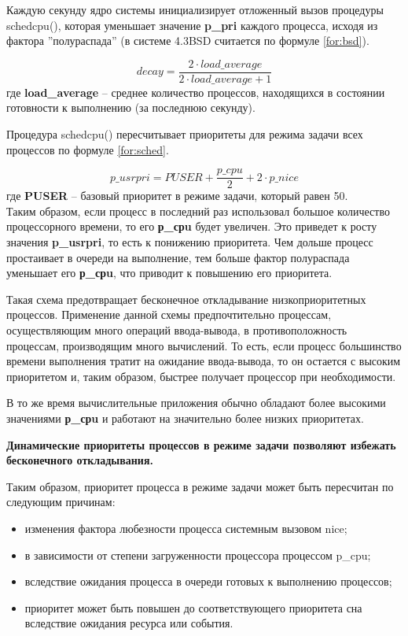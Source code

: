 \documentclass[a4paper,14pt,russian]{extreport}
\begin{document}
	Каждую секунду ядро системы инициализирует отложенный вызов процедуры schedcpu(), которая уменьшает значение \textbf{p\_pri} каждого процесса, исходя из фактора ”полураспада” (в системе 4.3BSD считается по формуле \ref{for:bsd}).
	
	\begin{equation}
		\label{for:bsd}
		decay = \frac{2 \cdot load\_average}{2 \cdot load\_average + 1}
	\end{equation}
	где \textbf{load\_average} -- среднее количество процессов, находящихся в состоянии готовности к выполнению (за последнюю секунду).
	
	Процедура schedcpu() пересчитывает приоритеты для режима задачи всех процессов по формуле \ref{for:sched}.
	
	\begin{equation}
		\label{for:sched}
		p\_usrpri = PUSER + \frac{p\_cpu}{2} + 2 \cdot p\_nice
	\end{equation}
	где \textbf{PUSER} -- базовый приоритет в режиме задачи, который равен 50.
	\\
	
	Таким образом, если процесс в последний раз использовал большое количество процессорного времени, то его \textbf{р\_срu} будет увеличен.
	Это приведет к росту значения \textbf{p\_usrpri}, то есть к понижению приоритета.
	Чем дольше процесс простаивает в очереди на выполнение, тем больше фактор полураспада уменьшает его \textbf{р\_срu}, что приводит к повышению его приоритета.
	
	Такая схема предотвращает бесконечное откладывание низкоприоритетных процессов.
	Применение данной схемы предпочтительно процессам, осуществляющим много операций ввода-вывода, в противоположность процессам, производящим много вычислений.
	То есть, если процесс большинство времени выполнения тратит на ожидание ввода-вывода, то он остается с высоким приоритетом и, таким образом, быстрее получает процессор при необходимости.
	
	В то же время вычислительные приложения обычно обладают более высокими значениями \textbf{р\_срu} и работают на значительно более низких приоритетах.
	
	\textbf{Динамические приоритеты процессов в режиме задачи позволяют избежать бесконечного откладывания.}
	
	Таким образом, приоритет процесса в режиме задачи может быть пересчитан по следующим причинам:
	\begin{itemize}
		\item изменения фактора любезности процесса системным вызовом nice;
		\item в зависимости от степени загруженности процессора процессом p\_cpu;
		\item вследствие ожидания процесса в очереди готовых к выполнению процессов;
		\item приоритет может быть повышен до соответствующего приоритета сна вследствие ожидания ресурса или события.
	\end{itemize}
\end{document}
